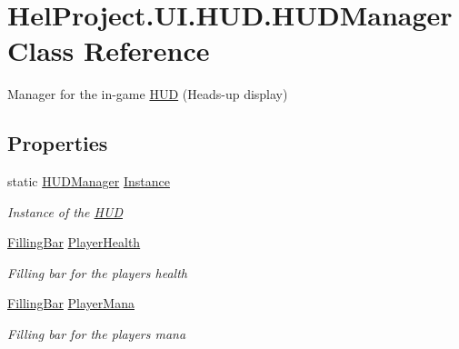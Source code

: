 \hypertarget{class_hel_project_1_1_u_i_1_1_h_u_d_1_1_h_u_d_manager}{}\section{Hel\+Project.\+U\+I.\+H\+U\+D.\+H\+U\+D\+Manager Class Reference}
\label{class_hel_project_1_1_u_i_1_1_h_u_d_1_1_h_u_d_manager}


Manager for the in-\/game \hyperlink{namespace_hel_project_1_1_u_i_1_1_h_u_d}{H\+U\+D} (Heads-\/up display)  


\subsection*{Properties}
\begin{DoxyCompactItemize}
\item 
static \hyperlink{class_hel_project_1_1_u_i_1_1_h_u_d_1_1_h_u_d_manager}{H\+U\+D\+Manager} \hyperlink{class_hel_project_1_1_u_i_1_1_h_u_d_1_1_h_u_d_manager_ae6812a87fea78cc46470b329f9eb981d}{Instance}
\begin{DoxyCompactList}\small\item\em Instance of the \hyperlink{namespace_hel_project_1_1_u_i_1_1_h_u_d}{H\+U\+D} \end{DoxyCompactList}\item 
\hyperlink{class_hel_project_1_1_u_i_1_1_h_u_d_1_1_filling_bar}{Filling\+Bar} \hyperlink{class_hel_project_1_1_u_i_1_1_h_u_d_1_1_h_u_d_manager_ab347bc0ee8f76e51967bfe44e304e833}{Player\+Health}
\begin{DoxyCompactList}\small\item\em Filling bar for the player\textquotesingle{}s health \end{DoxyCompactList}\item 
\hyperlink{class_hel_project_1_1_u_i_1_1_h_u_d_1_1_filling_bar}{Filling\+Bar} \hyperlink{class_hel_project_1_1_u_i_1_1_h_u_d_1_1_h_u_d_manager_a394ad7478afc5a6ec3a71c6e3d41995d}{Player\+Mana}
\begin{DoxyCompactList}\small\item\em Filling bar for the player\textquotesingle{}s mana \end{DoxyCompactList}\end{DoxyCompactItemize}


